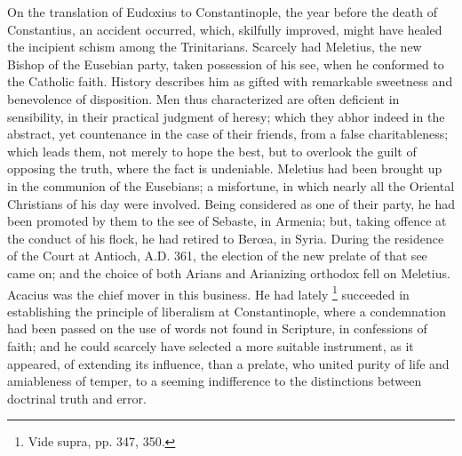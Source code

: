 On the translation of Eudoxius to Constantinople, the year before
the death of Constantius, an accident occurred, which, skilfully
improved, might have healed the incipient schism among the
Trinitarians. Scarcely had Meletius, the new Bishop of the Eusebian
party, taken possession of his see, when he conformed to the Catholic
faith. History describes him as gifted with remarkable sweetness and
benevolence of disposition. Men thus characterized are often deficient
in sensibility, in their practical judgment of heresy; which they
abhor indeed in the abstract, yet countenance in the case of their
friends, from a false charitableness; which leads them, not merely to
hope the best, but to overlook the guilt of opposing the truth, where
the fact is undeniable. Meletius had been brought up in the communion
of the Eusebians; a misfortune, in which nearly all the Oriental
Christians of his day were involved. Being considered as one of their
party, he had been promoted by them to the see of Sebaste, in Armenia;
but, taking offence at the conduct of his flock, he had retired to
Berœa, in Syria. During the residence of the Court at Antioch, A.D.
361, the election of the new prelate of that see came on; and the
choice of both Arians and Arianizing orthodox fell on Meletius.
Acacius was the chief mover in this business. He had lately \footnote{Vide supra, pp. 347, 350.} succeeded in establishing the principle of liberalism at
Constantinople, where a condemnation had been passed on the use of
words not found in Scripture, in confessions of faith; and he
could scarcely have selected a more suitable instrument, as it
appeared, of extending its influence, than a prelate, who united
purity of life and amiableness of temper, to a seeming indifference to
the distinctions between doctrinal truth and error.

